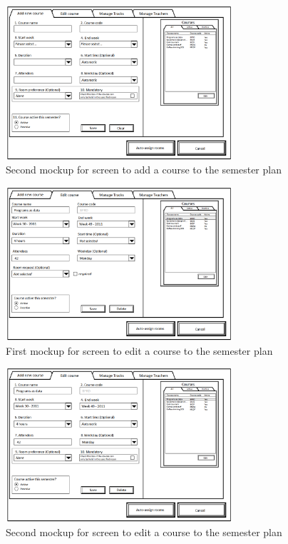 \begin{figure}
\begin{center}
\leavevmode
\includegraphics[width=0.75\textwidth]{images/courseplan2_addcourse}
\end{center}
\caption{Second mockup for screen to add a course to the semester plan}
\label{fig:app2_mock2_1}
\end{figure}

\begin{figure}
\begin{center}
\leavevmode
\includegraphics[width=0.75\textwidth]{images/courseplan_editcourse}
\end{center}
\caption{First mockup for screen to edit a course to the semester plan}
\label{fig:app2_mock1_2}
\end{figure}

\begin{figure}
\begin{center}
\leavevmode
\includegraphics[width=0.75\textwidth]{images/courseplan2_editcourse}
\end{center}
\caption{Second mockup for screen to edit a course to the semester plan}
\label{fig:app2_mock2_2}
\end{figure}

